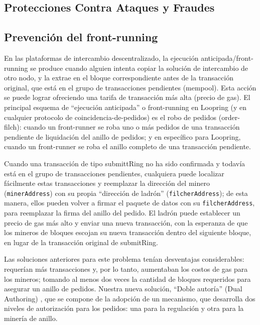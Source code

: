 \documentclass[UTF8,nofonts]{article}
\begin{document}
\begin{multicols}{2}
\section{Protecciones Contra Ataques y Fraudes}
\subsection{Prevenci\'on del front-running\label{sec:dual_authoring}}
En las plataformas de intercambio descentralizado, la ejecuci\'on anticipada/front-running se produce cuando alguien intenta copiar la soluci\'on de intercambio de otro nodo, y la extrae en el bloque correspondiente antes de la transacci\'on original, que est\'a en el grupo de transacciones pendientes (mempool). Esta acci\'on se puede lograr ofreciendo una tarifa de transacci\'on m\'as alta (precio de gas). El principal esquema de \enquote{ejecuci\'on anticipada} o front-running en Loopring (y en cualquier protocolo de coincidencia-de-pedidos) es el robo de pedidos (order-filch): cuando un front-runner se roba uno o m\'as pedidos de una transacci\'on pendiente de liquidaci\'on del anillo de pedidos; y en espec\'ifico para Loopring, cuando un front-runner se roba el anillo completo de una transacci\'on pendiente.


Cuando una transacci\'on de tipo submittRing no ha sido confirmada y todav\'ia est\'a en el grupo de transacciones pendientes, cualquiera puede localizar f\'acilmente estas transacciones y reemplazar la direcci\'on del minero (\verb|minerAddress|) con su propia \enquote{direcci\'on de ladr\'on} (\verb|filcherAddress|); de esta manera, ellos pueden volver a firmar el paquete de datos con su \verb|filcherAddress|, para reemplazar la firma del anillo del pedido. El ladr\'on puede establecer un precio de gas m\'as alto y enviar una nueva transacci\'on, con la esperanza de que los mineros de bloques escojan su nueva transacci\'on dentro del siguiente bloque, en lugar de la transacci\'on original de submitRing.

Las soluciones anteriores para este problema ten\'ian desventajas considerables: requer\'ian m\'as transacciones y, por lo tanto, aumentaban los costos de gas para los mineros; tomando al menos dos veces la cantidad de bloques requeridos para asegurar un anillo de pedidos. Nuestra nueva soluci\'on, \enquote{Doble autor\'ia} (Dual Authoring) \cite{dualauthor}, que se compone de la adopci\'on de un mecanismo, que desarrolla dos niveles de autorizaci\'on para los pedidos: una para la regulaci\'on y otra para la miner\'ia de anillo.



\end{multicols}
\end{document}
